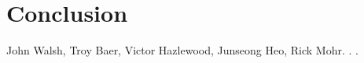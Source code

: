\documentclass[10pt, conference, compsocconf]{IEEEtran}
\begin{document}
\section{Conclusion}





%
%
%
\begin{thebibliography}{1}

John Walsh, Troy Baer, Victor Hazlewood, Junseong Heo, Rick Mohr.
.
.
\end{thebibliography}


\end{document}
